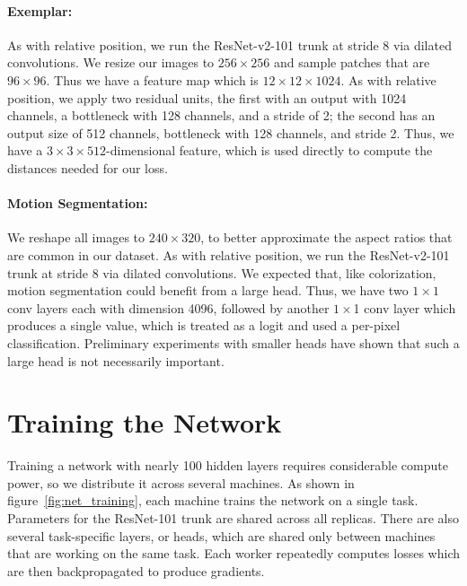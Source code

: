 \documentclass[10pt,twocolumn,letterpaper]{article}
\begin{document}
\paragraph{Exemplar:}
As with relative position, we run the ResNet-v2-101 trunk at stride 8 via dilated convolutions.
We resize our images to $256 \times 256$ and sample patches that are $96 \times 96$.
Thus we have a feature map which is $12 \times 12 \times 1024$.
As with relative position, we apply two residual units, the first with an output with 1024 channels, a bottleneck with 128 channels, and a stride of 2; the second has an output size of 512 channels, bottleneck with 128 channels, and stride 2.
Thus, we have a $3 \times 3 \times 512$-dimensional feature, which is used directly to compute the distances needed for our loss.

\paragraph{Motion Segmentation:}
We reshape all images to $240 \times 320$, to better approximate the aspect ratios that are common in our dataset.
As with relative position, we run the ResNet-v2-101 trunk at stride 8 via dilated convolutions.
We expected that, like colorization, motion segmentation could benefit from a large head.  
Thus, we have two $1 \times 1$ conv layers each with dimension 4096, followed by another $1 \times $1 conv layer which produces a single value, which is treated as a logit and used a per-pixel classification.
Preliminary experiments with smaller heads have shown that such a large head is not necessarily important.


\section{Training the Network}

\label{sec:training}
Training a network with nearly 100 hidden layers requires considerable compute power, so we distribute it across several machines.
As shown in figure~\ref{fig:net_training}, each machine trains the network on a single task.  
Parameters for the ResNet-101 trunk are shared across all replicas.
There are also several task-specific layers, or heads, which are shared only between machines that are working on the same task.
Each worker repeatedly computes losses which are then backpropagated to produce gradients.
\end{document}
